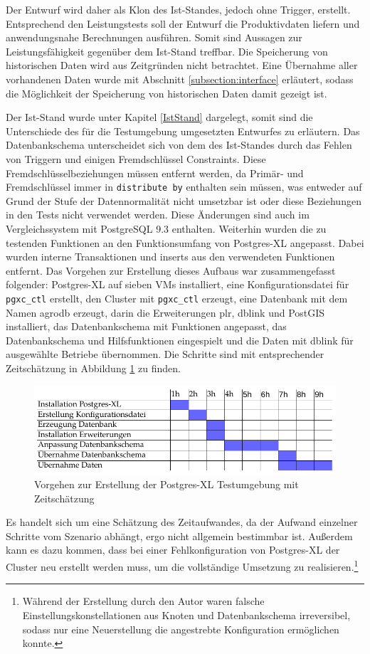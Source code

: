 Der Entwurf wird daher als Klon des Ist-Standes, jedoch ohne Trigger, erstellt.
Entsprechend den Leistungstests soll der Entwurf die Produktivdaten liefern und anwendungsnahe Berechnungen ausführen.
Somit sind Aussagen zur Leistungsfähigkeit gegenüber dem Ist-Stand treffbar.
Die Speicherung von historischen Daten wird aus Zeitgründen nicht betrachtet.
Eine Übernahme aller vorhandenen Daten wurde mit Abschnitt \ref{subsection:interface} erläutert, sodass die Möglichkeit der Speicherung von historischen Daten damit gezeigt ist.

Der Ist-Stand wurde unter Kapitel \ref{IstStand} dargelegt, somit sind die Unterschiede des für die Testumgebung umgesetzten Entwurfes zu erläutern.
Das Datenbankschema unterscheidet sich von dem des Ist-Standes durch das Fehlen von Triggern und einigen Fremdschlüssel Constraints.
Diese Fremdschlüsselbeziehungen müssen entfernt werden, da Primär- und Fremdschlüssel immer in \verb+distribute by+ enthalten sein müssen, was entweder auf Grund der Stufe der Datennormalität nicht umsetzbar ist oder diese Beziehungen in den Tests nicht verwendet werden.
Diese Änderungen sind auch im Vergleichssystem mit PostgreSQL 9.3 enthalten.
Weiterhin wurden die zu testenden Funktionen an den Funktionsumfang von Postgres-XL angepasst.
Dabei wurden interne Transaktionen und inserts aus den verwendeten Funktionen entfernt.
Das Vorgehen zur Erstellung dieses Aufbaus war zusammengefasst folgender:
Postgres-XL auf sieben VMs installiert, eine Konfigurationsdatei für \verb+pgxc_ctl+ erstellt, den Cluster mit \verb+pgxc_ctl+ erzeugt, eine Datenbank mit dem Namen agrodb erzeugt, darin die Erweiterungen plr, dblink und PostGIS installiert, das Datenbankschema mit Funktionen angepasst, das Datenbankschema und Hilfsfunktionen eingespielt und die Daten mit dblink für ausgewählte Betriebe übernommen.
Die Schritte sind mit entsprechender Zeitschätzung in Abbildung \ref{fig:getan} zu finden.
\newpage
\begin{figure}[h!]
\centering
\includegraphics[width=.8\textwidth]{Abbildungen/gantt_done_cropped.pdf}
\caption[Vorgehen zur Erstellung der Postgres-XL Testumgebung]{Vorgehen zur Erstellung der Postgres-XL Testumgebung mit Zeitschätzung}
\label{fig:getan}
\end{figure}
Es handelt sich um eine Schätzung des Zeitaufwandes, da der Aufwand einzelner Schritte vom Szenario abhängt, ergo nicht allgemein bestimmbar ist.
Außerdem kann es dazu kommen, dass bei einer Fehlkonfiguration von Postgres-XL der Cluster neu erstellt werden muss, um die vollständige Umsetzung zu realisieren.\footnote{Während der Erstellung durch den Autor waren falsche Einstellungskonstellationen aus Knoten und Datenbankschema irreversibel, sodass nur eine Neuerstellung die angestrebte Konfiguration ermöglichen konnte.}

